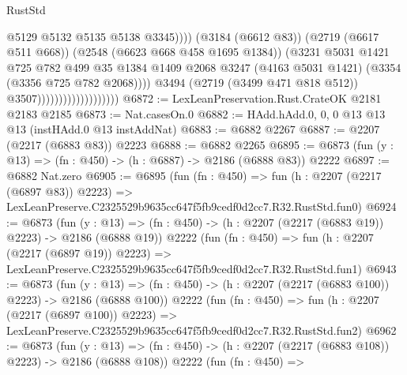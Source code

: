 \begin{lexlean}{RustStd}
\begin{coremodule}
                                                    @5129
                                                    @5132
                                                    @5135
                                                    @5138
                                                    @3345))))
                                            (@3184 (@6612 @83))
                                            (@2719 (@6617 @511 @668))
                                            (@2548 (@6623 @668 @458 @1695 @1384))
                                            (@3231
                                              @5031
                                              @1421
                                              @725
                                              @782
                                              @499
                                              @35
                                              @1384
                                              @1409
                                              @2068
                                              @3247
                                              (@4163 @5031 @1421)
                                              (@3354 (@3356 @725 @782 @2068))))
                                          @3494
                                          (@2719 (@3499 @471 @818 @512))
                                          @3507)))))))))))))))))))
@6872 := LexLeanPreservation.Rust.CrateOK @2181 @2183 @2185
@6873 := Nat.casesOn.{0}
@6882 := HAdd.hAdd.{0, 0, 0} @13 @13 @13 (instHAdd.{0} @13 instAddNat)
@6883 := @6882 @2267
@6887 := @2207 (@2217 (@6883 @83)) @2223
@6888 := @6882 @2265
@6895 := @6873 (fun (y : @13) => (fn : @450) -> (h : @6887) -> @2186 (@6888 @83)) @2222
@6897 := @6882 Nat.zero
@6905 := @6895
    (fun (fn : @450) =>
    fun (h : @2207 (@2217 (@6897 @83)) @2223) =>
    LexLeanPreserve.C2325529b9635cc647f5fb9cedf0d2cc7.R32.RustStd.fun0)
@6924 := @6873
    (fun (y : @13) => (fn : @450) -> (h : @2207 (@2217 (@6883 @19)) @2223) -> @2186 (@6888 @19))
    @2222
    (fun (fn : @450) =>
    fun (h : @2207 (@2217 (@6897 @19)) @2223) =>
    LexLeanPreserve.C2325529b9635cc647f5fb9cedf0d2cc7.R32.RustStd.fun1)
@6943 := @6873
    (fun (y : @13) => (fn : @450) -> (h : @2207 (@2217 (@6883 @100)) @2223) -> @2186 (@6888 @100))
    @2222
    (fun (fn : @450) =>
    fun (h : @2207 (@2217 (@6897 @100)) @2223) =>
    LexLeanPreserve.C2325529b9635cc647f5fb9cedf0d2cc7.R32.RustStd.fun2)
@6962 := @6873
    (fun (y : @13) => (fn : @450) -> (h : @2207 (@2217 (@6883 @108)) @2223) -> @2186 (@6888 @108))
    @2222
    (fun (fn : @450) =>

\end{coremodule}
\end{lexlean}
